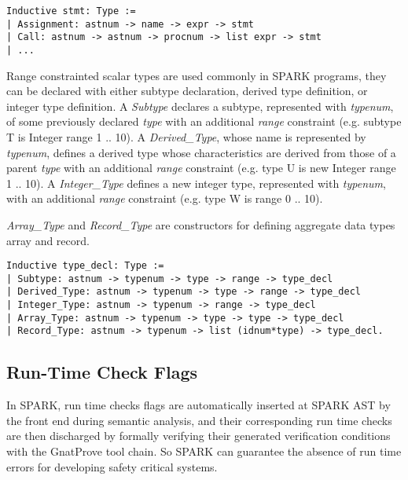 \begin{lstlisting}[escapechar=\#, language=coq, basicstyle=\small]
Inductive stmt: Type := 
| Assignment: astnum -> name -> expr -> stmt 
| Call: astnum -> astnum -> procnum -> list expr -> stmt 
| ...
\end{lstlisting}

Range constrainted scalar types are used commonly in SPARK programs, they can be
declared with either subtype declaration, derived type definition, or integer
type definition. 
A \textit{Subtype} declares a subtype, represented with
\textit{typenum}, of some previously declared \textit{type} with an additional \textit{range}
constraint (e.g. subtype T is Integer range 1 .. 10).
A \textit{Derived\_Type}, whose name is represented by \textit{typenum},
defines a derived type whose characteristics are derived from those of a parent
\textit{type} with an additional \textit{range} constraint (e.g. type U is new
Integer range 1 .. 10).
A \textit{Integer\_Type} defines a new integer type, represented with
\textit{typenum}, with an additional \textit{range} constraint (e.g. type W is
range 0 .. 10).

\textit{Array\_Type} and \textit{Record\_Type} are constructors for defining
aggregate data types array and record.

\begin{lstlisting}[escapechar=\#, language=coq, basicstyle=\small]
Inductive type_decl: Type := 
| Subtype: astnum -> typenum -> type -> range -> type_decl 
| Derived_Type: astnum -> typenum -> type -> range -> type_decl 
| Integer_Type: astnum -> typenum -> range -> type_decl 
| Array_Type: astnum -> typenum -> type -> type -> type_decl 
| Record_Type: astnum -> typenum -> list (idnum*type) -> type_decl.
\end{lstlisting}


\subsection{Run-Time Check Flags}
In SPARK, run time checks flags are automatically inserted at SPARK AST by the
front end during semantic analysis, and their corresponding run time checks are
then discharged by formally verifying their generated verification conditions
with the GnatProve tool chain. So SPARK can guarantee the absence of run time
errors for developing safety critical systems.

